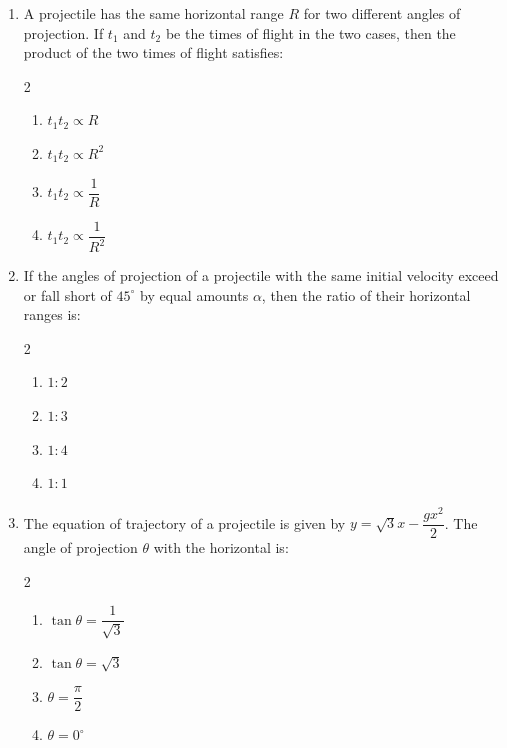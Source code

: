 \documentclass[11pt,a4paper]{article}
\begin{document}
\begin{enumerate}[label=\textbf{\textcolor{l1Green}{Q\arabic*.}},leftmargin=24pt,itemsep=10pt]
  \item A projectile has the same horizontal range $R$ for two different angles of projection. If $t_1$ and $t_2$ be the times of flight in the two cases, then the product of the two times of flight satisfies:
  \begin{multicols}{2}
  \begin{enumerate}[label=\textbf{\textcolor{primaryDark}{(\Alph*)}},itemsep=2pt]
    \item $t_1 t_2 \propto R$
    \item $t_1 t_2 \propto R^2$
    \item $t_1 t_2 \propto \dfrac{1}{R}$
    \item $t_1 t_2 \propto \dfrac{1}{R^2}$
  \end{enumerate}
  \end{multicols}

  \item If the angles of projection of a projectile with the same initial velocity exceed or fall short of $45^\circ$ by equal amounts $\alpha$, then the ratio of their horizontal ranges is:
  \begin{multicols}{2}
  \begin{enumerate}[label=\textbf{\textcolor{primaryDark}{(\Alph*)}},itemsep=2pt]
    \item $1 : 2$
    \item $1 : 3$
    \item $1 : 4$
    \item $1 : 1$
  \end{enumerate}
  \end{multicols}

  \item The equation of trajectory of a projectile is given by $y = \sqrt{3}x - \dfrac{gx^2}{2}$. The angle of projection $\theta$ with the horizontal is:
  \begin{multicols}{2}
  \begin{enumerate}[label=\textbf{\textcolor{primaryDark}{(\Alph*)}},itemsep=2pt]
    \item $\tan\theta = \dfrac{1}{\sqrt{3}}$
    \item $\tan\theta = \sqrt{3}$
    \item $\theta = \dfrac{\pi}{2}$
    \item $\theta = 0^\circ$
  \end{enumerate}
  \end{multicols}


\end{enumerate}
\end{document}
